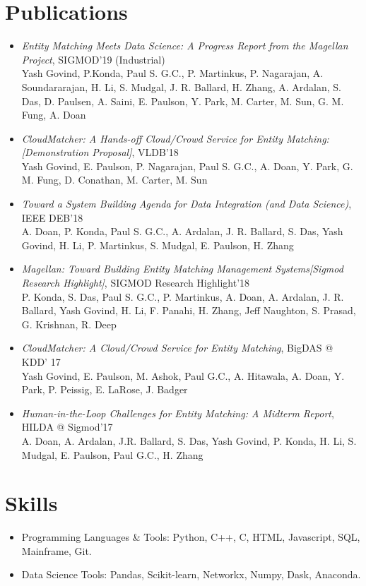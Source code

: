 \documentclass{resume}
\begin{document}
\section{Publications}
\begin{itemize}
  \item \emph{Entity Matching Meets Data Science: A Progress Report from the Magellan Project}, {SIGMOD'19 (Industrial)} \\
Yash Govind, P.Konda, Paul S. G.C., P. Martinkus, P. Nagarajan, A. Soundararajan, H. Li, S. Mudgal, J. R. Ballard, H. Zhang, A. Ardalan, S. Das, D. Paulsen, A. Saini, E. Paulson, Y. Park, M. Carter, M. Sun, G. M. Fung, A. Doan
  \item \emph{CloudMatcher: A Hands-off Cloud/Crowd Service for Entity Matching: [Demonstration Proposal]}, {VLDB'18} \\
Yash Govind, E. Paulson, P. Nagarajan, Paul S. G.C., A. Doan, Y. Park, G. M. Fung, D. Conathan, M. Carter, M. Sun
  \item \emph{Toward a System Building Agenda for Data Integration (and Data Science)}, {IEEE DEB'18} \\
A. Doan, P. Konda, Paul S. G.C., A. Ardalan, J. R. Ballard, S. Das, Yash Govind, H. Li, P. Martinkus, S. Mudgal, E. Paulson, H. Zhang
  \item \emph{Magellan: Toward Building Entity Matching Management Systems[Sigmod Research Highlight]}, {SIGMOD Research Highlight'18} \\
P. Konda, S. Das, Paul S. G.C., P. Martinkus, A. Doan, A. Ardalan, J. R. Ballard, Yash Govind, H. Li, F. Panahi, H. Zhang, Jeff Naughton, S. Prasad, G. Krishnan, R. Deep
  \item \emph{CloudMatcher: A Cloud/Crowd Service for Entity Matching}, {BigDAS @ KDD' 17} \\
Yash Govind, E. Paulson, M. Ashok, Paul G.C., A. Hitawala, A. Doan, Y. Park, P. Peissig, E. LaRose, J. Badger
  \item \emph{Human-in-the-Loop Challenges for Entity Matching: A Midterm Report}, {HILDA @ Sigmod'17} \\
A. Doan, A. Ardalan, J.R. Ballard, S. Das, Yash Govind, P. Konda, H. Li, S. Mudgal, E. Paulson, Paul G.C., H. Zhang
\end{itemize}

\section{Skills}
\begin{itemize}[parsep=0.5ex]
  \item Programming Languages \& Tools: Python, C++, C, HTML, Javascript, SQL, Mainframe, Git.
  \item Data Science Tools: Pandas, Scikit-learn, Networkx, Numpy, Dask, Anaconda.
\end{itemize}
\end{document}
